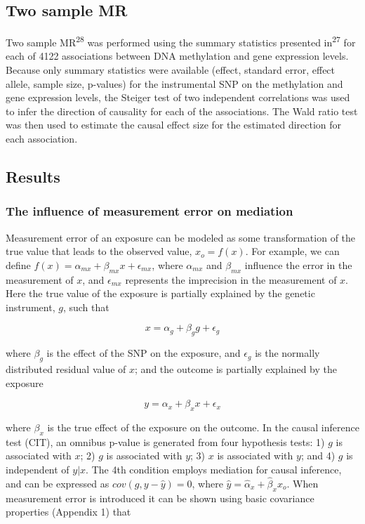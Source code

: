 \documentclass[]{article}
\begin{document}
\subsection{Two sample MR}\label{two-sample-mr}

Two sample MR\textsuperscript{28} was performed using the summary
statistics presented in\textsuperscript{27} for each of 4122
associations between DNA methylation and gene expression levels. Because
only summary statistics were available (effect, standard error, effect
allele, sample size, p-values) for the instrumental SNP on the
methylation and gene expression levels, the Steiger test of two
independent correlations was used to infer the direction of causality
for each of the associations. The Wald ratio test was then used to
estimate the causal effect size for the estimated direction for each
association.

\subsection{Results}\label{results}

\subsubsection{The influence of measurement error on
mediation}\label{the-influence-of-measurement-error-on-mediation}

Measurement error of an exposure can be modeled as some transformation
of the true value that leads to the observed value, \(x_o = f(x)\). For
example, we can define
\(f(x) = \alpha_{mx} + \beta_{mx} x + \epsilon_{mx}\), where
\(\alpha_{mx}\) and \(\beta_{mx}\) influence the error in the
measurement of \(x\), and \(\epsilon_{mx}\) represents the imprecision
in the measurement of \(x\). Here the true value of the exposure is
partially explained by the genetic instrument, \(g\), such that

\[
x = \alpha_g + \beta_g g + \epsilon_g
\]

where \(\beta_g\) is the effect of the SNP on the exposure, and
\(\epsilon_g\) is the normally distributed residual value of \(x\); and
the outcome is partially explained by the exposure

\[
y = \alpha_x + \beta_x x + \epsilon_x
\]

where \(\beta_x\) is the true effect of the exposure on the outcome. In
the causal inference test (CIT), an omnibus p-value is generated from
four hypothesis tests: 1) \(g\) is associated with \(x\); 2) \(g\) is
associated with \(y\); 3) \(x\) is associated with \(y\); and 4) \(g\)
is independent of \(y|x\). The 4th condition employs mediation for
causal inference, and can be expressed as \(cov(g, y - \hat{y}) = 0\),
where \(\hat{y} = \hat{\alpha}_x + \hat{\beta}_x x_o\). When measurement
error is introduced it can be shown using basic covariance properties
(Appendix 1) that
\end{document}
